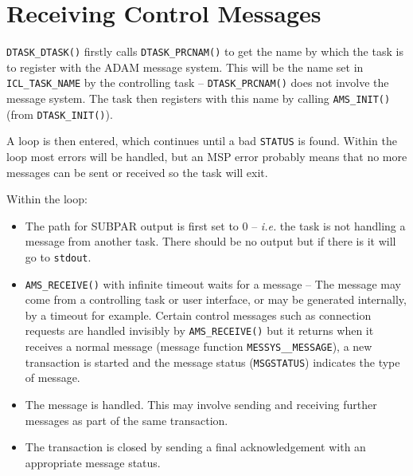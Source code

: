 \documentclass[twoside,11pt,nolof]{starlink}
\begin{document}
\section{\label{receiving_control_messages}Receiving Control Messages}
\texttt{DTASK\_DTASK()} firstly calls \texttt{DTASK\_PRCNAM()} to get the name
by which the task is to register with the ADAM message system.
This will be the name set in
\texttt{ICL\_TASK\_NAME} by the controlling task -- \texttt{DTASK\_PRCNAM()}
does not involve the message system.
The task then registers with this name by calling \texttt{AMS\_INIT()}
(from \texttt{DTASK\_INIT()}).

A loop is then entered, which continues until a bad \texttt{STATUS} is found.
Within the loop most errors will be handled, but an MSP error probably means
that no more messages can be sent or received so the task will exit.

Within the loop:
\begin{itemize}
\item The path for SUBPAR output is first set to 0 -- \textit{i.e.} the task
is not handling a message from another task.
There should be no output but if there is it will go to \texttt{stdout}.
\item \texttt{AMS\_RECEIVE()} with infinite timeout waits for a message --
The message may come from a controlling task or user interface, or may be
generated internally, by a timeout for example.
Certain control messages such as connection requests are handled invisibly
by \texttt{AMS\_RECEIVE()} but it returns when it receives a normal message
(message function \texttt{MESSYS\_\_MESSAGE}), a new transaction is started
and the message status (\texttt{MSGSTATUS}) indicates the type of message.
\item The message is handled. This may involve sending and receiving further
messages as part of the same transaction.
\item The transaction is closed by sending a final acknowledgement with an
appropriate message status.
\end{itemize}
\end{document}
